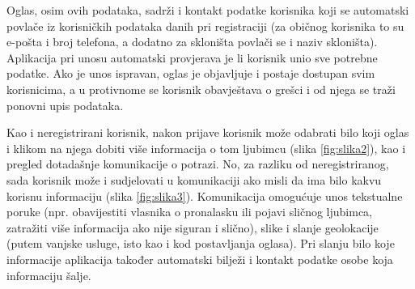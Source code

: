 		Oglas, osim ovih podataka, sadrži i kontakt podatke korisnika koji se automatski povlače iz korisničkih podataka danih pri registraciji (za običnog korisnika to su e-pošta i broj telefona, a dodatno za skloništa povlači se i naziv skloništa). Aplikacija pri unosu automatski provjerava je li korisnik unio sve potrebne podatke. Ako je unos ispravan, oglas je objavljuje i postaje dostupan svim korisnicima, a u protivnome se korisnik obavještava o grešci i od njega se traži ponovni upis podataka.

Kao i neregistrirani korisnik, nakon prijave korisnik može odabrati bilo koji oglas i klikom na njega dobiti više informacija o tom ljubimcu (slika \ref{fig:slika2}), kao i pregled dotadašnje komunikacije o potrazi. No, za razliku od neregistriranog, sada korisnik može i sudjelovati u komunikaciji ako misli da ima bilo kakvu korisnu informaciju (slika \ref{fig:slika3}). Komunikacija omogućuje unos tekstualne poruke (npr. obavijestiti vlasnika o pronalasku ili pojavi sličnog ljubimca, zatražiti više informacija ako nije siguran i slično), slike i slanje geolokacije (putem vanjske usluge, isto kao i kod postavljanja oglasa). Pri slanju bilo koje informacije aplikacija također automatski bilježi i kontakt podatke osobe koja informaciju šalje.

